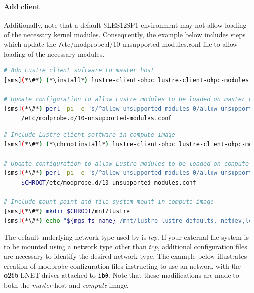 \documentclass[letterpaper]{article}
\newcommand{\baseOS}{SLES12SP1}
\newcommand{\install}{zypper -n install}
\newcommand{\chrootinstall}{zypper -n --root \$CHROOT install}
\begin{document}
\paragraph{Add \Lustre{} client} \label{sec:lustre_client}

Additionally, note that a default \baseOS{} environment may not allow loading of
the necessary \Lustre{} kernel modules. Consequently, the example below includes
steps which update the {\texttt /etc/modprobe.d/10-unsupported-modules.conf}
file to allow loading of the necessary modules.


\begin{lstlisting}[language=bash,keywords={},upquote=true]
# Add Lustre client software to master host
[sms](*\#*) (*\install*) lustre-client-ohpc lustre-client-ohpc-modules

# Update configuration to allow Lustre modules to be loaded on master host
[sms](*\#*) perl -pi -e "s/^allow_unsupported_modules 0/allow_unsupported_modules 1/" \
     /etc/modprobe.d/10-unsupported-modules.conf
\end{lstlisting}

\clearpage
\begin{lstlisting}[language=bash,keywords={},upquote=true]
# Include Lustre client software in compute image
[sms](*\#*) (*\chrootinstall*) lustre-client-ohpc lustre-client-ohpc-modules

# Update configuration to allow Lustre modules to be loaded on compute hosts
[sms](*\#*) perl -pi -e "s/^allow_unsupported_modules 0/allow_unsupported_modules 1/" \
     $CHROOT/etc/modprobe.d/10-unsupported-modules.conf

# Include mount point and file system mount in compute image
[sms](*\#*) mkdir $CHROOT/mnt/lustre
[sms](*\#*) echo "${mgs_fs_name} /mnt/lustre lustre defaults,_netdev,localflock 0 0" >> $CHROOT/etc/fstab
\end{lstlisting}

The default underlying network type used by \Lustre{} is {\em tcp}. If your
external \Lustre{} file system is to be mounted using a network type other than
{\em tcp}, additional configuration files are necessary to identify the desired
network type. The example below illustrates creation of modprobe configuration files
instructing \Lustre{} to use an \InfiniBand{} network with the \textbf{o2ib} LNET driver
attached to \texttt{ib0}. Note that these modifications are made to both the
{\em master} host and {\em compute} image.
\end{document}
